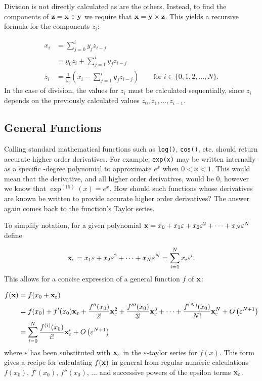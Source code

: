 \documentclass{article}
\begin{document}
Division is not directly calculated as are the others. Instead, to find the components of
${\bf z}={\bf x}\div{\bf y}$ we require that ${\bf x}={\bf y}\times{\bf z}$. This yields
a recursive formula for the components $z_i$:

\begin{align*}
x_i &= \sum_{j=0}^iy_jz_{i-j} \\
 &= y_0z_i + \sum_{j=1}^iy_jz_{i-j} \\
z_i &= \frac{1}{y_0}\left(x_i - \sum_{j=1}^iy_jz_{i-j}\right) \qquad \text{for}\; i\in\{0,1,2,...,N\}.
\end{align*}
In the case of division, the values for $z_i$ must be calculated sequentially, since $z_i$
depends on the previously calculated values $z_0, z_1, ..., z_{i-1}$.

\subsection{General Functions}

Calling standard mathematical functions such as {\tt log()}, {\tt cos()}, etc. should return accurate higher
order derivatives. For example, {\tt exp(x)} may be written internally as a specific -degree polynomial to
approximate $e^x$ when $0<x<1$. This would mean that the  derivative, and all higher order derivatives,
would be 0, however we know that $\exp^{(15)}(x)=e^x$.  How should such functions whose derivatives are known be
written to provide accurate higher order derivatives? The answer again comes back to the function's Taylor series.

To simplify notation, for a given polynomial ${\bf x} = x_0 + x_1\varepsilon + x_2\varepsilon^2 +\cdots+
x_N\varepsilon^N$ define

\[
{\bf x}_\varepsilon = x_1\varepsilon + x_2\varepsilon^2 +\cdots+ x_N\varepsilon^N = \sum_{i=1}^Nx_i\varepsilon^i.
\]
This allows for a concise expression of a general function $f$ of $\bf x$:

\begin{align*}
f({\bf x}) &= f(x_0 + {\bf x}_\varepsilon) \\
 & = f(x_0) + f'(x_0){\bf x}_\varepsilon + \frac{f''(x_0)}{2!}{\bf x}_\varepsilon^2 + \frac{f'''(x_0)}{3!}{\bf x}_\varepsilon^3 + \cdots + \frac{f^{(N)}(x_0)}{N!}{\bf x}_\varepsilon^N + O\left(\varepsilon^{N+1}\right) \\
 & = \sum_{i=0}^N\frac{f^{(i)}(x_0)}{i!}{\bf x}_\varepsilon^i + O\left(\varepsilon^{N+1}\right)
\end{align*}
where $\varepsilon$ has been substituted with ${\bf x}_\varepsilon$ in the $\varepsilon$-taylor series
for $f(x)$. This form gives a recipe for calculating $f({\bf x})$ in general from regular numeric calculations
$f(x_0)$, $f'(x_0)$, $f''(x_0)$, ... and successive powers of the epsilon terms ${\bf x}_\varepsilon$.
\end{document}
